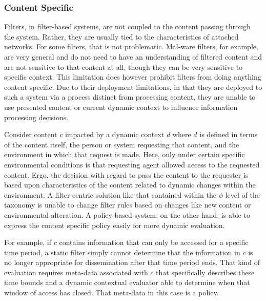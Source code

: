 \subsubsection*{Content Specific}
Filters, in filter-based systems, are not coupled to the content passing through the system.  Rather, they are usually tied to the characteristics of attached networks.  For some filters, that is not problematic.  Mal-ware filters, for example, are very general and do not need to have an understanding of filtered content and are not sensitive to that content at all, though they can be very sensitive to specific context.  This limitation does however prohibit filters from doing anything content specific.  Due to their deployment limitations, in that they are deployed to such a system via a process distinct from processing content, they are unable to use presented content or current dynamic context to influence information processing decisions.

Consider content $c$ impacted by a dynamic context $d$ where $d$ is defined in terms of the content itself, the person or system requesting that content, and the environment in which that request is made.  Here, only under certain specific environmental conditions is that requesting agent allowed access to the requested content.  Ergo, the decision with regard to pass the content to the requester is based upon characteristics of the content related to dynamic changes within the environment.  A filter-centric solution like that contained within the $\phi$ level of the taxonomy is unable to change filter rules based on changes like new content or environmental alteration.  A policy-based system, on the other hand, is able to express the content specific policy easily for more dynamic evaluation.

For example, if $c$ contains information that can only be accessed for a specific time period, a static filter simply cannot determine that the information in $c$ is no longer appropriate for dissemination after that time period ends.  That kind of evaluation requires meta-data associated with $c$ that specifically describes these time bounds and a dynamic contextual evaluator able to determine when that window of access has closed.  That meta-data in this case is a policy.

